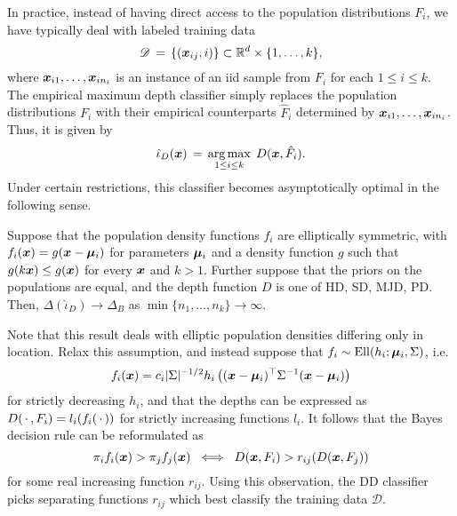 In practice, instead of having direct access to the population distributions
$F_i$, we have typically deal with labeled training data
\begin{equation}
    \mathscr{D} \,=\, \{(\bm{x}_{ij}, i)\} \subset \mathbb{R}^d \times \{1, \dots, k\},
\end{equation}
where $\bm{x}_{i1}, \dots, \bm{x}_{in_i}$ is an instance of an iid sample from $F_i$
for each $1 \leq i \leq k$.
The empirical maximum depth classifier simply replaces the population
distributions $F_i$ with their empirical counterparts $\hat{F}_i$ determined
by $\bm{x}_{i1}, \dots, \bm{x}_{in_i}$. Thus, it is given by
\begin{equation}
    \hat{\iota}_{D}(\bm{x}) \,=\, \operatorname*{arg\,max}_{1 \leq i \leq k}\; D(\bm{x}, \hat{F}_i).
\end{equation}
Under certain restrictions, this classifier becomes asymptotically optimal in
the following sense.

\begin{theorem}
    Suppose that the population density functions $f_i$ are elliptically
    symmetric, with $f_i(\bm{x}) = g(\bm{x} - \bm{\mu}_i)$ for parameters $\bm{\mu}_i$ and a
    density function $g$ such that $g(k\bm{x}) \leq g(\bm{x})$ for every $\bm{x}$ and
    $k > 1$. Further suppose that the priors on the populations are equal, and
    the depth function $D$ is one of HD, SD, MJD, PD. Then,
    $\Delta(\hat{\iota}_{D}) \to \Delta_B$ as $\min\{n_1, \dots,
    n_k\} \to \infty$.
\end{theorem}

Note that this result deals with elliptic population densities differing only
in location.
Relax this assumption, and instead suppose that $f_i \sim \operatorname{Ell}(h_i; \bm{\mu}_i,
\Sigma)$, i.e.
\begin{equation}
    f_i(\bm{x}) = c_i |\Sigma|^{-1/2} h_i\left((\bm{x} - \bm{\mu}_i)^\top \Sigma^{-1} (\bm{x} - \bm{\mu}_i)\right)
\end{equation}
for strictly decreasing $h_i$, and that the depths can be expressed as
$D(\,\cdot\,, F_i) = l_i(f_i(\,\cdot\,))$ for strictly increasing functions $l_i$.
It follows that the Bayes decision rule can be reformulated as
\begin{equation}
    \pi_i f_i(\bm{x}) > \pi_j f_j(\bm{x}) \;\iff\; D(\bm{x}, F_i) > r_{ij}(D(\bm{x}, F_j))
\end{equation}
for some real increasing function $r_{ij}$.
Using this observation, the DD classifier \parencite{li-albertos-liu-2012}
picks separating functions $r_{ij}$ which best classify the training data
$\mathscr{D}$.

